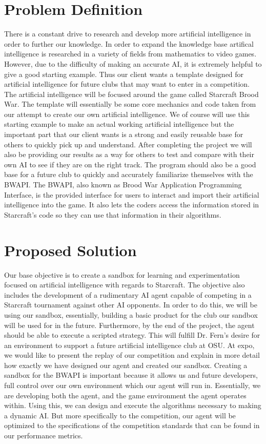 \documentclass[10pt,letterpaper,onecolumn,draftclsnofoot]{IEEEtran}
\begin{document}
\section{Problem Definition}
There is a constant drive to research and develop more artificial intelligence in order to further our knowledge. In order to expand the knowledge base artifical intelligence is researched in a variety of fields from mathematics to video games. However, due to the difficulty of making an accurate AI, it is extremely helpful to give a good starting example. Thus our client wants a template designed for artificial intelligence for future clubs that may want to enter in a competition. The artificial intelligence will be focused around the game called Starcraft Brood War. The template will essentially be some core mechanics and code taken from our attempt to create our own artificial intelligence. We of course will use this starting example to make an actual working artificial intelligence but the important part that our client wants is a strong and easily reusable base for others to quickly pick up and understand. After completing the project we will also be providing our results as a way for others to test and compare with their own AI to see if they are on the right track. The program should also be a good base for a future club to quickly and accurately familiarize themselves with the BWAPI. The BWAPI, also known as Brood War Application Programming Interface, is the provided interface for users to interact and import their artificial intelligence into the game. It also lets the coders access the information stored in Starcraft's code so they can use that information in their algorithms.

\section{Proposed Solution}
Our base objective is to create a sandbox for learning and experimentation focused on artificial intelligence with regards to Starcraft. The objective also includes the development of a rudimentary AI agent capable of competing in a Starcraft tournament against other AI opponents. In order to do this, we will be using our sandbox, essentially, building a basic product for the club our sandbox will be used for in the future. Furthermore, by the end of the project, the agent should be able to execute a scripted strategy. This will fulfill Dr. Fern's desire for an environment to support a future artificial intelligence club at OSU. At expo, we would like to present the replay of our competition and explain in more detail how exactly we have designed our agent and created our sandbox.
Creating a sandbox for the BWAPI is important because it allows us and future developers, full control over our own environment which our agent will run in. Essentially, we are developing both the agent, and the game environment the agent operates within. Using this, we can design and execute the algorithms necessary to making a dynamic AI. But more specifically to the competition, our agent will be optimized to the specifications of the competition standards that can be found in our performance metrics. 
\end{document}

